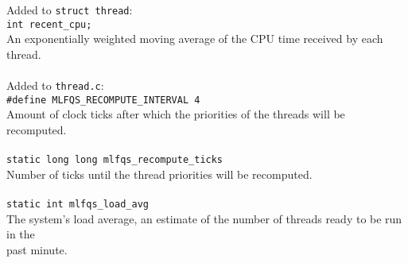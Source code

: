 \documentclass[a4wide, 11pt]{article}
\newcommand{\tab}{\hspace*{2em}}
\newcommand{\tx}{\texttt}
\begin{document}
Added to \tx{struct thread}: \\
\tab\tab \tx{int recent\_cpu;} \\
\tab\tab An exponentially weighted moving average of the CPU time received by each thread.
\\\\
Added to \tx{thread.c}: \\
\tab\tab \tx{\#define MLFQS\_RECOMPUTE\_INTERVAL 4} \\
\tab\tab Amount of clock ticks after which the priorities of the threads will be recomputed.
\\\\
\tab\tab \tx{static long long mlfqs\_recompute\_ticks} \\
\tab\tab Number of ticks until the thread priorities will be recomputed.
\\\\
\tab\tab \tx{static int mlfqs\_load\_avg}\\
\tab\tab The system's load average, an estimate of the number of threads ready to be run in the \\
\tab\tab past minute.
\end{document}
